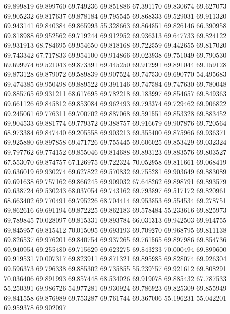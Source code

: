 69.899819
69.899760
69.749236
69.851886
67.391170
69.830674
69.627073
69.905232
69.817637
69.878184
69.795545
69.868333
69.529031
69.911320
69.943141
69.840384
69.865993
55.328663
69.864851
69.826146
66.390958
69.818988
69.952562
69.719244
69.912952
69.936313
69.647733
69.824122
69.931913
68.784695
69.954650
69.818168
69.722559
69.442655
69.817020
69.743342
67.717833
69.954100
69.914866
69.023938
69.751049
69.790530
69.699974
69.521043
69.873391
69.445250
69.912991
69.891044
69.159128
69.873128
69.879072
69.589839
69.907524
69.747530
69.690770
54.495683
69.474385
69.950498
69.889522
69.391146
69.747584
69.747630
69.780048
69.885765
69.931211
68.617695
69.782218
69.183997
69.854657
69.849363
69.661126
69.845812
69.853084
69.962493
69.793374
69.729462
69.906822
69.245061
69.776311
69.700702
69.887068
69.591551
69.853328
69.883452
69.904533
69.881774
69.779372
69.388757
69.916679
69.907876
69.720564
68.973384
69.847440
69.205558
69.903213
69.355400
69.875966
69.936371
69.925880
69.897858
69.471726
69.755445
69.606025
69.853429
69.032324
69.797762
69.774152
69.855046
69.814688
69.893123
69.883576
69.803527
67.553070
69.874757
67.126975
69.722324
70.052958
69.811661
69.068419
69.636019
69.930274
69.627822
69.570832
69.755281
69.903649
69.883089
69.691638
69.757162
69.866245
69.909032
67.648262
69.898791
69.893579
69.638724
69.530243
68.037054
69.743162
69.793897
69.517172
69.820961
68.663402
69.770491
69.795226
68.704414
69.953853
69.554534
69.278751
69.862616
69.691194
69.872225
69.862183
69.578484
55.233616
69.825973
69.789845
70.028097
69.815331
69.893784
66.031313
69.942503
69.914755
69.845957
69.815412
70.015095
69.693193
69.709270
69.968795
69.811138
69.826537
69.976201
69.840754
69.937265
69.761565
69.897986
69.854736
69.940954
69.255480
69.715629
69.623275
69.843233
70.000494
69.899600
69.919531
70.007317
69.823911
69.871321
69.895985
69.828074
69.926304
69.596373
69.796338
69.885302
69.735855
55.239757
69.921612
69.808291
70.036406
69.891993
69.857448
68.534026
69.919078
69.885432
67.787533
55.250391
69.986726
54.977281
69.930924
69.786923
69.825309
69.855949
69.841558
69.876989
69.753287
69.761744
69.367006
55.196231
55.042201
69.959378
69.902097
